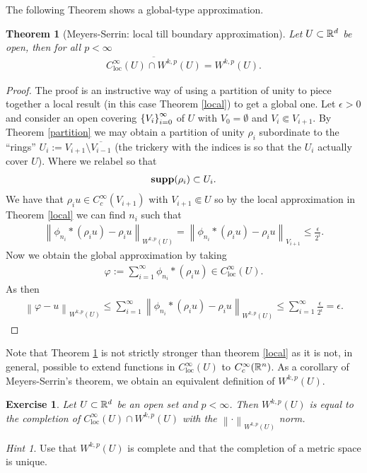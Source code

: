 \documentclass[12pt]{article}
\newtheorem{theorem}{Theorem}
\newtheorem{exercise}{Exercise}
\theoremstyle{remark}
\newtheorem*{hint}{Hint}
\renewcommand{\norm}[1]{\left\lVert #1 \right\rVert}\renewcommand{\abs}[1]{\left| #1 \right|}
\begin{document}
The following Theorem shows a global-type approximation.
\begin{theorem}[Meyers-Serrin: local till boundary approximation]\label{Meyers}
	Let $U \subset \mathbb{R}^d$ be open, then for all $p<\infty$
	\begin{align*}
		\overline{C^\infty_{\mathrm{loc}}(U)\cap W^{k,p}(U)}=W^{k,p}(U).
	\end{align*}
\end{theorem}
\begin{proof}The proof is an instructive way of using a partition of unity to piece together a local result (in this case Theorem \ref{local}) to get a global one. Let $\epsilon >0$ and consider an open covering $\left\{V_i\right\}_{i=0}^\infty $ of $U$ with $V_0 =\emptyset$ and $V_{i} \Subset V_{i+1}$. By Theorem \ref{partition} we may obtain a partition of unity $\rho _i$ subordinate to the ``rings'' $U_{i}:= V_{i+1}\setminus \overline{V_{i-1}}$ (the trickery with the indices is so that the $U_i$ actually  cover $U$). Where we relabel so that
	\begin{align*}
		\mathbf{supp}(\rho _i)\subset U_i .
	\end{align*}
	We have that $\rho_i u \in C_c^\infty({V_{i+1}})$ with $V_{i+1} \Subset U$ so by the local approximation in Theorem \ref{local} we can find $n_i$ such that
	\begin{align*}
		\norm{\phi_{n_i}*(\rho_i u)-\rho_i u}_{W^{k,p}(U)}=\norm{\phi_{n_i}*(\rho_i u)-\rho_i u}_{V_{i+1}}\leq \frac{\epsilon }{2^i} .
	\end{align*}
	Now we obtain the global approximation by taking
	\begin{align*}
		\varphi:= \sum_{i=1}^\infty \phi_{n_i}* (\rho_i u) \in C_{\mathrm{loc}}^\infty(U) .
	\end{align*}
	As then
	\begin{align*}
		\norm{\varphi-u}
		_{W^{k,p}(U)}\leq\sum_{i=1}^\infty \norm{\phi_{n_i}*(\rho_i u)-\rho_i u }_{W^{k,p}(U)}\leq \sum_{i=1}^\infty \frac{\epsilon }{2^i}=\epsilon   .
	\end{align*}
\end{proof}
Note that Theorem \ref{Meyers} is not strictly stronger than theorem \ref{local} as it is not, in general, possible to extend functions in $C^\infty_{\mathrm{loc}}(U)$ to $C_c^\infty(\mathbb{R}^n)$. As a corollary of Meyers-Serrin's theorem, we obtain an equivalent definition of $W^{k,p}(U)$.
\begin{exercise}\label{eq def} Let $U \subset \mathbb{R}^d$ be an open set and $p<\infty$. Then $W^{k,p}(U)$ is equal to the completion of  $C^\infty_{\mathrm{loc}}(U)\cap W^{k,p}(U)$ with the $\norm{\cdot }_{W^{k,p}(U)}$ norm.
\end{exercise}
\begin{hint}
	Use that $W^{k,p}(U)$ is complete and that the completion of a metric space is unique.
\end{hint}
\end{document}
